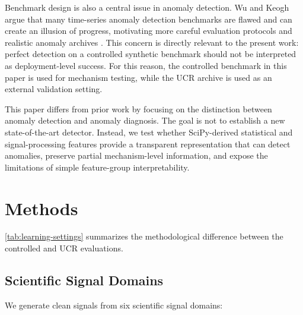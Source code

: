 Benchmark design is also a central issue in anomaly detection. Wu and Keogh argue that many time-series anomaly detection benchmarks are flawed and can create an illusion of progress, motivating more careful evaluation protocols and realistic anomaly archives \citep{wu2021ucr}. This concern is directly relevant to the present work: perfect detection on a controlled synthetic benchmark should not be interpreted as deployment-level success. For this reason, the controlled benchmark in this paper is used for mechanism testing, while the UCR archive is used as an external validation setting.

This paper differs from prior work by focusing on the distinction between anomaly detection and anomaly diagnosis. The goal is not to establish a new state-of-the-art detector. Instead, we test whether SciPy-derived statistical and signal-processing features provide a transparent representation that can detect anomalies, preserve partial mechanism-level information, and expose the limitations of simple feature-group interpretability.

\section{Methods}

\cref{tab:learning-settings} summarizes the methodological difference between the controlled and UCR evaluations.

\begin{table}[htbp]
\centering
\caption{Learning settings used in the two evaluation stages.}
\label{tab:learning-settings}
\end{table}

\subsection{Scientific Signal Domains}

We generate clean signals from six scientific signal domains:

